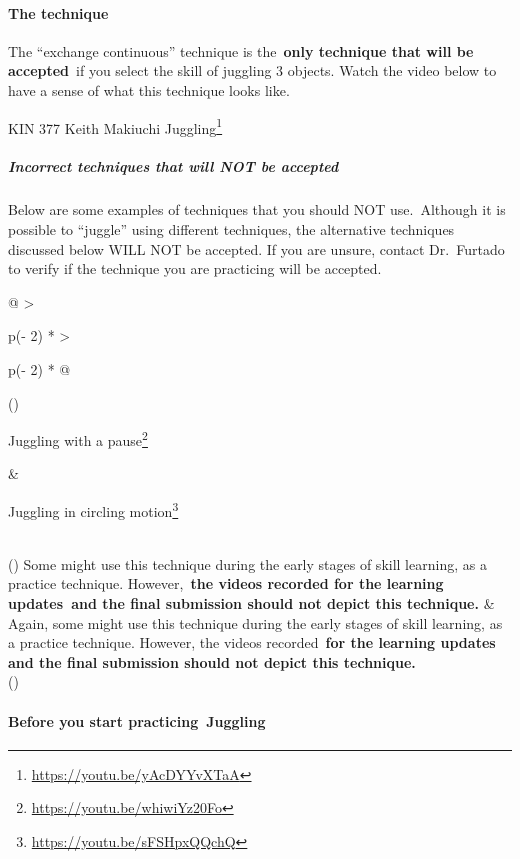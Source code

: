 \documentclass[
  letterpaper,
  DIV=11,
  numbers=noendperiod]{scrartcl}
\let\oldparagraph\paragraph
\renewcommand{\paragraph}[1]{\oldparagraph{#1}\mbox{}}
\let\oldsubparagraph\subparagraph
\renewcommand{\subparagraph}[1]{\oldsubparagraph{#1}\mbox{}}
\DeclareRobustCommand{\href}[2]{#2\footnote{\url{#1}}}
\begin{document}
\hypertarget{the-technique}{%
\paragraph{The technique}\label{the-technique}}

The ``exchange continuous'' technique is the~\textbf{only technique that
will be accepted}~if you select the skill of juggling 3 objects. Watch
the video below to have a sense of what this technique looks like.

\href{https://youtu.be/yAcDYYvXTaA}{KIN 377 Keith Makiuchi Juggling}

\hypertarget{incorrect-techniques-that-will-not-be-accepted}{%
\subparagraph{\texorpdfstring{Incorrect techniques that will \textbf{NOT
be
accepted}}{Incorrect techniques that will NOT be accepted}}\label{incorrect-techniques-that-will-not-be-accepted}}

Below are some examples of techniques that you should NOT use.~Although
it is possible to ``juggle'' using different techniques, the alternative
techniques discussed below WILL NOT be accepted. If you are unsure,
contact Dr.~Furtado to verify if the technique you are practicing will
be accepted.

\begin{longtable}[]{@{}
  >{\raggedright\arraybackslash}p{(\columnwidth - 2\tabcolsep) * }
  >{\raggedright\arraybackslash}p{(\columnwidth - 2\tabcolsep) * }@{}}
\toprule()
\begin{minipage}[b]{\linewidth}\raggedright
\href{https://youtu.be/whiwiYz20Fo}{Juggling with a pause}
\end{minipage} & \begin{minipage}[b]{\linewidth}\raggedright
\href{https://youtu.be/sFSHpxQQchQ}{Juggling in circling motion}
\end{minipage} \\
\midrule()
\endhead
Some might use this technique during the early stages of skill learning,
as a practice technique. However,~\textbf{the videos recorded for the
learning updates~and the final submission should not depict this
technique.} & Again, some might use this technique during the early
stages of skill learning, as a practice technique. However, the videos
recorded~\textbf{for the learning updates and the final submission
should not depict this technique.} \\
\bottomrule()
\end{longtable}

\hypertarget{before-you-start-practicing-juggling}{%
\paragraph{\texorpdfstring{Before you start
practicing~\textbf{Juggling}}{Before you start practicing~Juggling}}\label{before-you-start-practicing-juggling}}
\end{document}
